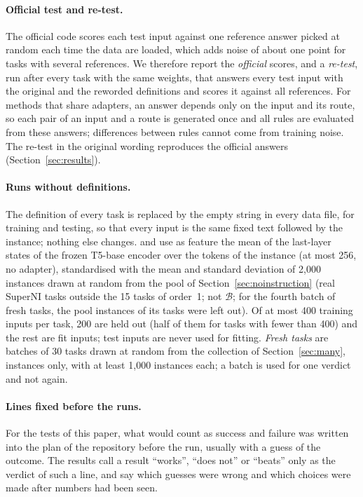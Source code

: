 \paragraph{Official test and re-test.} The official code scores each test input against one
reference answer picked at random each time the data are loaded, which adds noise of about one
point for tasks with several references. We therefore report the \emph{official} scores, and a
\emph{re-test}, run after every task with the same weights, that answers every test input with the
original and the reworded definitions and scores it against all references. For methods that share
adapters, an answer depends only on the input and its route, so each pair of an input and a route is
generated once and all rules are evaluated from these answers; differences between rules cannot come
from training noise. The re-test in the original wording reproduces the official answers
(Section~\ref{sec:results}).

\paragraph{Runs without definitions.} The definition of every task is replaced by the empty string in
every data file, for training and testing, so that every input is the same fixed text followed by the instance; nothing else changes. \recog{} and \handicap{} use as
feature the mean of the last-layer states of the frozen T5-base encoder over the tokens of the
instance (at most 256, no adapter), standardised with the mean and standard deviation of 2{,}000
instances drawn at random from the pool of Section~\ref{sec:noinstruction} (real SuperNI tasks outside
the 15 tasks of order~1; not $\mathcal{B}$; for the fourth batch of fresh tasks, the pool instances of
its tasks were left out). Of at most 400 training inputs per task, 200 are held out (half of them for
tasks with fewer than 400) and the rest are fit inputs; test inputs are never used for fitting.
\emph{Fresh tasks} are batches of 30 tasks drawn at random from the collection of
Section~\ref{sec:many}, instances only, with at least 1{,}000 instances each; a batch is used for one
verdict and not again.

\paragraph{Lines fixed before the runs.} For the tests of this paper, what would count as success and
failure was written into the plan of the repository before the run, usually with a guess of the
outcome. The results call a result ``works'', ``does not'' or ``beats'' only as the verdict of such a
line, and say which guesses were wrong and which choices were made after numbers had been seen.

